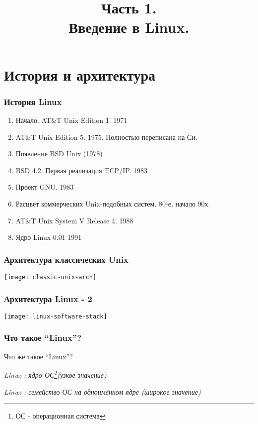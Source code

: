 

\title[SaM Solutions. Linux QA Training]
{
  Часть 1.\\
  Введение в Linux.
}



\begin{frame}
  \titlepage
\end{frame}

\section{История и архитектура}

\begin{frame}
  \frametitle{История Linux}

  \begin{enumerate}
    \item Начало. AT\&T Unix Edition 1. 1971
    \item AT\&T Unix Edition 5. 1975. Полностью переписана на Си. 
    \item Появление BSD Unix (1978)
    \item BSD 4.2. Первая реализация TCP/IP. 1983
    \item Проект GNU. 1983 
    \item Расцвет коммерческих Unix-подобных систем. 80-е, начало 90х.
    \item AT\&T Unix System V Release 4. 1988
    \item Ядро Linux 0.01 1991 
  \end{enumerate}

\end{frame}

\begin{frame}
  \frametitle{Архитектура классических Unix}
    \texttt{[image: classic-unix-arch]}
\end{frame}


\begin{frame}
  \frametitle{Архитектура Linux - 2}

  \begin{center}
    \texttt{[image: linux-software-stack]}
  \end{center}

\end{frame}

\begin{frame}
  \frametitle{Что такое ``Linux''?}
  \begin{center}
    \alert{Что же такое ``Linux''?}
  \end{center}

  \pause 

  \emph{Linux : ядро ОС\footnote{ОС - операционная система}(узкое значение)}
  \newline
  \pause

  \emph{Linux : семейство ОС на одноимённом ядре (широкое значение)}

\end{frame}

